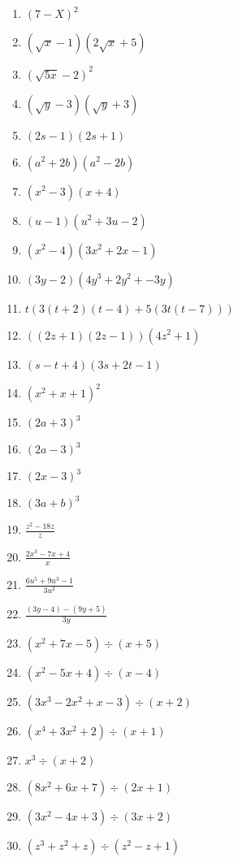 \documentclass{article}
\begin{document}
\begin{onehalfspace}
\begin{enumerate}
    \item $(7 - X)^{2}$
    \item $(\sqrt{x} - 1)(2\sqrt{x} + 5)$
    \item $(\sqrt{5x} - 2)^{2}$
    \item $(\sqrt{y} - 3)(\sqrt{y} + 3)$
    \item $(2s - 1)(2s + 1)$
    \item $(a^{2} + 2b)(a^{2} - 2b)$
    \item $(x^{2} - 3)(x + 4)$
    \item $(u - 1)(u^{2} + 3u - 2)$
    \item $(x^{2} - 4)(3x^{2} + 2x - 1)$
    \item $(3y - 2)(4y^{3} + 2y^{2} + -3y)$
    \item $t(3(t + 2)(t - 4) + 5(3t(t - 7)))$
    \item $((2z + 1)(2z - 1))(4z^{2} + 1)$
    \item $(s - t + 4)(3s + 2t - 1)$
    \item $(x^{2} + x + 1)^{2}$
    \item $(2a + 3)^{3}$
    \item $(2a - 3)^{3}$
    \item $(2x - 3)^{3}$
    \item $(3a + b)^{3}$
    \item $\frac{z^{2} - 18z}{z}$
    \item $\frac{2x^{3} - 7x + 4}{x}$
    \item $\frac{6u^{5} + 9u^{3} - 1}{3u^{2}}$
    \item $\frac{(3y - 4) - (9y + 5)}{3y}$
    \item $(x^{2} + 7x - 5) \div (x + 5)$
    \item $(x^{2} - 5x + 4) \div (x - 4)$
    \item $(3x^{3} - 2x^{2} + x - 3) \div (x + 2)$
    \item $(x^{4} + 3x^{2} + 2) \div (x + 1)$
    \item $x^{3} \div (x + 2)$
    \item $(8x^{2} + 6x + 7) \div (2x + 1)$
    \item $(3x^{2} - 4x + 3) \div (3x + 2)$
    \item $(z^{3}+ z^{2} + z) \div (z^{2} - z + 1)$
\end{enumerate}
\end{onehalfspace}
\end{document}
